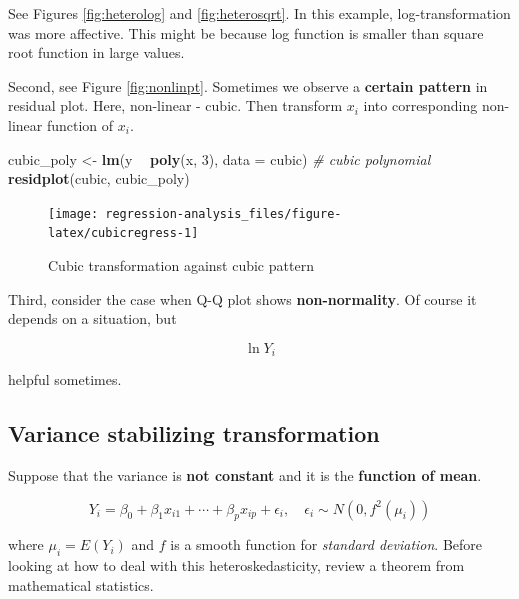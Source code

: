 \documentclass[]{book}
\newenvironment{Shaded}{\begin{snugshade}}{\end{snugshade}}
\newcommand{\CommentTok}[1]{\textcolor[rgb]{0.56,0.35,0.01}{\textit{#1}}}
\newcommand{\DataTypeTok}[1]{\textcolor[rgb]{0.13,0.29,0.53}{#1}}
\newcommand{\DecValTok}[1]{\textcolor[rgb]{0.00,0.00,0.81}{#1}}
\newcommand{\KeywordTok}[1]{\textcolor[rgb]{0.13,0.29,0.53}{\textbf{#1}}}
\newcommand{\NormalTok}[1]{#1}
\newcommand{\OperatorTok}[1]{\textcolor[rgb]{0.81,0.36,0.00}{\textbf{#1}}}
\newcommand{\StringTok}[1]{\textcolor[rgb]{0.31,0.60,0.02}{#1}}
\theoremstyle{definition}
\theoremstyle{definition}
\theoremstyle{definition}
\theoremstyle{remark}
\begin{document}
See Figures \ref{fig:heterolog} and \ref{fig:heterosqrt}. In this example, log-transformation was more affective. This might be because log function is smaller than square root function in large values.

Second, see Figure \ref{fig:nonlinpt}. Sometimes we observe a \textbf{certain pattern} in residual plot. Here, non-linear - cubic. Then transform \(x_i\) into corresponding non-linear function of \(x_i\).

\begin{Shaded}
\begin{Highlighting}[]
\NormalTok{cubic_poly <-}\StringTok{ }\KeywordTok{lm}\NormalTok{(y }\OperatorTok{~}\StringTok{ }\KeywordTok{poly}\NormalTok{(x, }\DecValTok{3}\NormalTok{), }\DataTypeTok{data =}\NormalTok{ cubic) }\CommentTok{# cubic polynomial}
\KeywordTok{residplot}\NormalTok{(cubic, cubic_poly)}
\end{Highlighting}
\end{Shaded}

\begin{figure}[H]

{\centering \texttt{[image: regression-analysis\_files/figure-latex/cubicregress-1]} 

}

\caption{Cubic transformation against cubic pattern}\label{fig:cubicregress}
\end{figure}

Third, consider the case when Q-Q plot shows \textbf{non-normality}. Of course it depends on a situation, but

\[\ln Y_i\]

helpful sometimes.

\hypertarget{variance-stabilizing-transformation}{%
\subsection{Variance stabilizing transformation}\label{variance-stabilizing-transformation}}

Suppose that the variance is \textbf{not constant} and it is the \textbf{function of mean}.

\[Y_i = \beta_0 + \beta_1 x_{i1} + \cdots + \beta_p x_{ip} + \epsilon_{i}, \quad \epsilon_i \sim N(0, f^2(\mu_i))\]

where \(\mu_i = E(Y_i)\) and \(f\) is a smooth function for \emph{standard deviation}. Before looking at how to deal with this heteroskedasticity, review a theorem from mathematical statistics.
\end{document}
